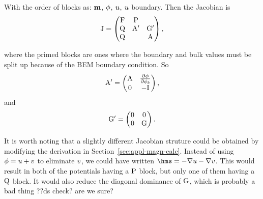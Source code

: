 With the order of blocks as: $\mathbf{m}$, $\phi$, $u$, $u$ boundary.
Then the Jacobian is
\begin{equation}
  \mathrm{J} = 
  \begin{pmatrix}
    \mathrm{F}       & \mathrm{P}     &  \\
    \mathrm{Q}       & \mathrm{A}' &  {\mathbf{\mathrm{G}}}'  \\
    \mathrm{Q}       &         &   \mathrm{A}
  \end{pmatrix},
\end{equation}


where the primed blocks are ones where the boundary and bulk values must be split up because of the BEM boundary condition.
So
\begin{equation}
  \mathrm{A}' =
  \begin{pmatrix}
     \mathrm{A}     & \frac{\partial \phi}{\partial \phi_b} \\
       0      & -\mathrm{I}  
  \end{pmatrix},
\end{equation}
and
\begin{equation}
  {\mathbf{\mathrm{G}}}' =
  \begin{pmatrix}
     0  & 0 \\
     0  & {\mathbf{\mathrm{G}}} 
  \end{pmatrix}.
\end{equation}


It is worth noting that a slightly different Jacobian struture could be obtained by modifying the derivation in Section~\ref{sec:appl-magn-calc}.
Instead of using $\phi = u + v$ to eliminate $v$, we could have written $\hms = - \grad \phione - \grad \phitwo$.
This would result in both of the potentials having a $\mathrm{P}$ block, but only one of them having a $\mathrm{Q}$ block.
It would also reduce the diagonal dominance of ${\mathbf{\mathrm{G}}}$, which is probably a bad thing ??ds check? are we sure?


